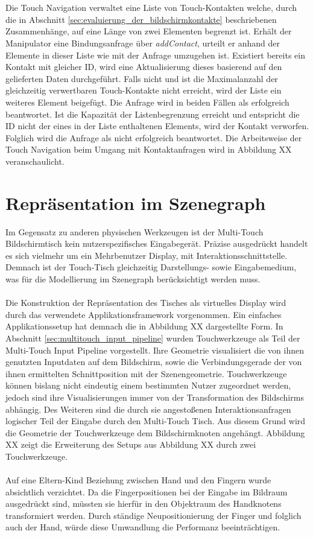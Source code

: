 \\\\
Die Touch Navigation verwaltet eine Liste von Touch-Kontakten welche, durch die in Abschnitt \ref{sec:evaluierung_der_bildschirmkontakte} beschriebenen Zusammenhänge, auf eine Länge von zwei Elementen begrenzt ist. Erhält der Manipulator eine Bindungsanfrage über \emph{addContact}, urteilt er anhand der Elemente in dieser Liste wie mit der Anfrage umzugehen ist. Existiert bereits ein Kontakt mit gleicher ID, wird eine Aktualisierung dieses basierend auf den gelieferten Daten durchgeführt. Falls nicht und ist die Maximalanzahl der gleichzeitig verwertbaren Touch-Kontakte nicht erreicht, wird der Liste ein weiteres Element beigefügt. Die Anfrage wird in beiden Fällen als erfolgreich beantwortet. Ist die Kapazität der Listenbegrenzung erreicht und entspricht die ID nicht der eines in der Liste enthaltenen Elements, wird der Kontakt verworfen. Folglich wird die Anfrage als nicht erfolgreich beantwortet. Die Arbeitsweise der Touch Navigation beim Umgang mit Kontaktanfragen wird in Abbildung XX veranschaulicht.


\section{Repräsentation im Szenegraph}
\label{sec:rep_im_szenegraph}

Im Gegensatz zu anderen physischen Werkzeugen ist der Multi-Touch Bildschirmtisch kein nutzerspezifisches Eingabegerät. Präzise ausgedrückt handelt es sich vielmehr um ein Mehrbenutzer Display, mit Interaktionsschnittstelle. Demnach ist der Touch-Tisch gleichzeitig Darstellungs- sowie Eingabemedium, was für die Modellierung im Szenegraph berücksichtigt werden muss. 
\\\\
Die Konstruktion der Repräsentation des Tisches als virtuelles Display wird durch das verwendete Applikationsframework vorgenommen. Ein einfaches Applikationssetup hat demnach die in Abbildung XX dargestellte Form. In Abschnitt \ref{sec:multitouch_input_pipeline} wurden Touchwerkzeuge als Teil der Multi-Touch Input Pipeline vorgestellt. Ihre Geometrie visualisiert die  von ihnen genutzten Inputdaten auf dem Bildschirm, sowie die Verbindungsgerade der von ihnen ermittelten Schnittposition mit der Szenengeometrie. Touchwerkzeuge können bislang nicht eindeutig einem bestimmten Nutzer zugeordnet werden, jedoch sind ihre Visualisierungen immer von der Transformation des Bildschirms abhängig. Des Weiteren sind die durch sie angestoßenen Interaktionsanfragen logischer Teil der Eingabe durch den Multi-Touch Tisch. Aus diesem Grund wird die Geometrie der Touchwerkzeuge dem Bildschirmknoten angehängt. Abbildung XX zeigt die Erweiterung des Setups aus Abbildung XX durch zwei Touchwerkzeuge.
\\\\
Auf eine Eltern-Kind Beziehung zwischen Hand und den Fingern wurde absichtlich verzichtet. Da die Fingerpositionen bei der Eingabe im Bildraum ausgedrückt sind, müssten sie hierfür in den Objektraum des Handknotens transformiert werden. Durch ständige Neupositionierung der Finger und folglich auch der Hand, würde diese Umwandlung die Performanz beeinträchtigen.


